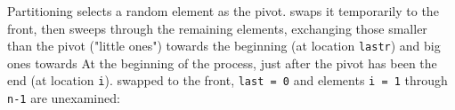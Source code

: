Partitioning selects a random element as the pivot. swaps it temporarily to
the front, then sweeps through the remaining elements, exchanging those
smaller than the pivot ("little ones") towards the beginning (at location
\verb'lastr') and big ones towards At the beginning of the process, just
after the pivot has been the end (at location \verb'i').  swapped to the
front, \verb'last = 0' and elements \verb'i = 1' through \verb'n-1' are
unexamined:
\begin{figure}[h]
    \centering
{}
\end{figure}
